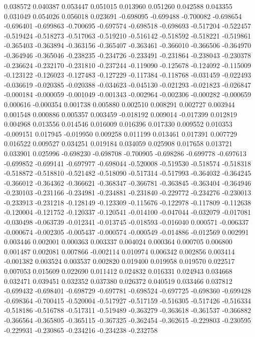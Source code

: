 0.038572
0.040387
0.053447
0.051015
0.013960
0.051260
0.042588
0.043355
0.031049
0.054026
0.056018
0.023691
-0.698095
-0.699488
-0.700082
-0.698654
-0.696401
-0.699863
-0.700695
-0.697574
-0.698518
-0.698693
-0.517204
-0.522457
-0.519424
-0.518273
-0.517063
-0.519210
-0.516142
-0.518592
-0.518221
-0.519861
-0.365403
-0.363894
-0.363156
-0.365407
-0.363461
-0.366010
-0.366506
-0.364970
-0.364946
-0.365046
-0.238235
-0.234726
-0.233491
-0.231864
-0.238043
-0.230378
-0.236624
-0.232170
-0.231810
-0.237244
-0.119090
-0.125678
-0.124092
-0.115009
-0.123122
-0.126023
-0.127483
-0.127229
-0.117384
-0.118768
-0.031459
-0.022493
-0.036619
-0.020385
-0.020388
-0.034623
-0.045130
-0.021293
-0.021823
-0.026847
-0.000184
-0.000059
-0.001049
-0.001343
-0.002964
-0.002306
-0.000282
-0.000659
0.000616
-0.000354
0.001738
0.005880
0.002510
0.008291
0.002727
0.003944
0.001548
0.000886
0.005357
0.003459
-0.018192
0.009014
-0.017399
0.012819
0.004968
0.013556
0.014546
0.016009
0.016396
0.017330
0.009552
0.010353
-0.009151
0.017945
-0.019950
0.009258
0.011199
0.013461
0.017391
0.007729
0.016522
0.009527
0.034251
0.019184
0.034059
0.025908
0.017658
0.013721
0.033901
0.025996
-0.698230
-0.698708
-0.700905
-0.698286
-0.699778
-0.697613
-0.699852
-0.699141
-0.697977
-0.698044
-0.520008
-0.519530
-0.518574
-0.518318
-0.518872
-0.518810
-0.521482
-0.518090
-0.517314
-0.517993
-0.364032
-0.364245
-0.366012
-0.364362
-0.366621
-0.368347
-0.366781
-0.363845
-0.363404
-0.364946
-0.230103
-0.231166
-0.234981
-0.234881
-0.231840
-0.229772
-0.234276
-0.230013
-0.233913
-0.231218
-0.128149
-0.123309
-0.115676
-0.122978
-0.117809
-0.112638
-0.120004
-0.121752
-0.120337
-0.120541
-0.014100
-0.047044
-0.032079
-0.017081
-0.030498
-0.063739
-0.012341
-0.013745
-0.018593
-0.016040
0.000571
-0.006337
-0.000674
-0.002305
-0.005437
-0.000574
-0.000549
-0.014886
-0.012569
0.002991
0.003446
0.002001
0.000363
0.003337
0.004024
0.000364
0.000705
0.006800
0.001487
0.002081
0.007866
-0.002114
0.010974
0.006342
0.002856
0.003414
-0.001382
0.003524
0.003537
0.002820
0.019400
0.019958
0.019570
0.022517
0.007053
0.015609
0.022690
0.011412
0.024832
0.016331
0.024943
0.034668
0.032471
0.039451
0.032352
0.037380
0.026372
0.040519
0.033466
0.037812
-0.699432
-0.698401
-0.698729
-0.697781
-0.698524
-0.697725
-0.698360
-0.699428
-0.698364
-0.700415
-0.520004
-0.517927
-0.517159
-0.516305
-0.517426
-0.516334
-0.518186
-0.516788
-0.517311
-0.519489
-0.363279
-0.363618
-0.361537
-0.366882
-0.366564
-0.365805
-0.365115
-0.367325
-0.362454
-0.362615
-0.229803
-0.230595
-0.229931
-0.230865
-0.234216
-0.234238
-0.232758

